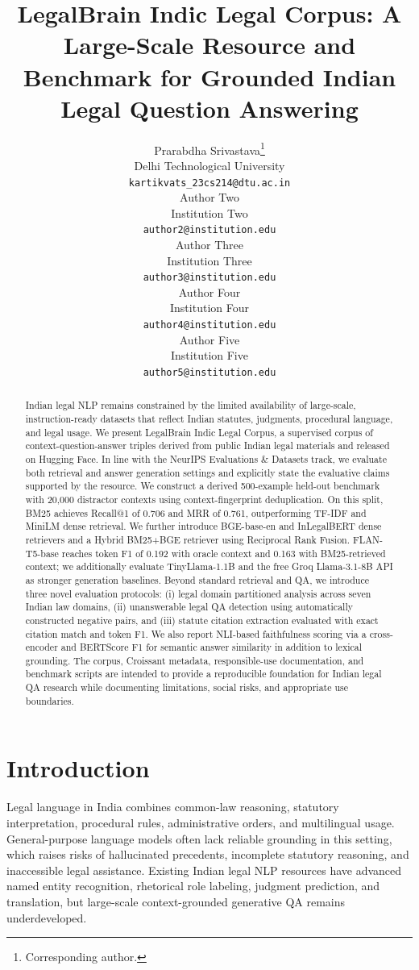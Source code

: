 \documentclass{article}
\title{LegalBrain Indic Legal Corpus: A Large-Scale Resource and Benchmark for Grounded Indian Legal Question Answering}
\author{%
  Prarabdha Srivastava\thanks{Corresponding author.} \\
  Delhi Technological University \\
  \texttt{kartikvats\_23cs214@dtu.ac.in} \\
  \And
  Author Two \\
  Institution Two \\
  \texttt{author2@institution.edu} \\
  \And
  Author Three \\
  Institution Three \\
  \texttt{author3@institution.edu} \\
  \And
  Author Four \\
  Institution Four \\
  \texttt{author4@institution.edu} \\
  \And
  Author Five \\
  Institution Five \\
  \texttt{author5@institution.edu} \\
}
\begin{document}
\maketitle

\begin{abstract}
Indian legal NLP remains constrained by the limited availability of large-scale, instruction-ready datasets that reflect Indian statutes, judgments, procedural language, and legal usage. We present LegalBrain Indic Legal Corpus, a supervised corpus of context-question-answer triples derived from public Indian legal materials and released on Hugging Face. In line with the NeurIPS Evaluations \& Datasets track, we evaluate both retrieval and answer generation settings and explicitly state the evaluative claims supported by the resource. We construct a derived 500-example held-out benchmark with 20,000 distractor contexts using context-fingerprint deduplication. On this split, BM25 achieves Recall@1 of 0.706 and MRR of 0.761, outperforming TF-IDF and MiniLM dense retrieval. We further introduce BGE-base-en and InLegalBERT dense retrievers and a Hybrid BM25+BGE retriever using Reciprocal Rank Fusion. FLAN-T5-base reaches token F1 of 0.192 with oracle context and 0.163 with BM25-retrieved context; we additionally evaluate TinyLlama-1.1B and the free Groq Llama-3.1-8B API as stronger generation baselines. Beyond standard retrieval and QA, we introduce three novel evaluation protocols: (i) legal domain partitioned analysis across seven Indian law domains, (ii) unanswerable legal QA detection using automatically constructed negative pairs, and (iii) statute citation extraction evaluated with exact citation match and token F1. We also report NLI-based faithfulness scoring via a cross-encoder and BERTScore F1 for semantic answer similarity in addition to lexical grounding. The corpus, Croissant metadata, responsible-use documentation, and benchmark scripts are intended to provide a reproducible foundation for Indian legal QA research while documenting limitations, social risks, and appropriate use boundaries.
\end{abstract}

\section{Introduction}

Legal language in India combines common-law reasoning, statutory interpretation, procedural rules, administrative orders, and multilingual usage. General-purpose language models often lack reliable grounding in this setting, which raises risks of hallucinated precedents, incomplete statutory reasoning, and inaccessible legal assistance. Existing Indian legal NLP resources have advanced named entity recognition, rhetorical role labeling, judgment prediction, and translation, but large-scale context-grounded generative QA remains underdeveloped.
\end{document}
